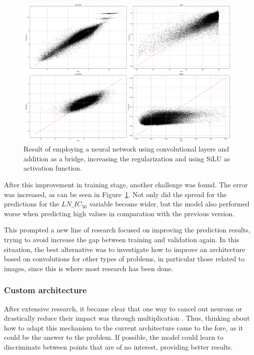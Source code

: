 \begin{figure}[H]
    \centering
    \includegraphics[width=1\textwidth]{figures/neural_net_regression_addition/output_neural_net_addition_balanced.png}
    \caption{Result of employing a neural network using convolutional layers and addition as a bridge, increasing the regularization and using SiLU as activation function.}
    \label{fig:result_addtion_reg_balanced}
\end{figure}

After this improvement in training stage, another challenge was found. The error was increased, as can be seen in Figure~\ref{fig:result_addtion_reg_balanced}. Not only did the spread for the predictions for the \(LN\_IC_{50}\) variable become wider, but the model also performed worse when predicting high values in comparation with the previous version.

This prompted a new line of research focused on improving the prediction results, trying to avoid increase the gap between training and validation again. In this situation, the best alternative was to investigate how to improve an architecture based on convolutions for other types of problems, in particular those related to images, since this is where most research has been done. 

\subsubsection{Custom architecture}

After extensive research, it became clear that one way to cancel out neurons or drastically reduce their impact was through multiplication \cite{contextgatedconvolution, gatedscnngatedshapecnns}. Thus, thinking about how to adapt this mechanism to the current architecture came to the fore, as it could be the answer to the problem. If possible, the model could learn to discriminate between points that are of no interest, providing better results.

